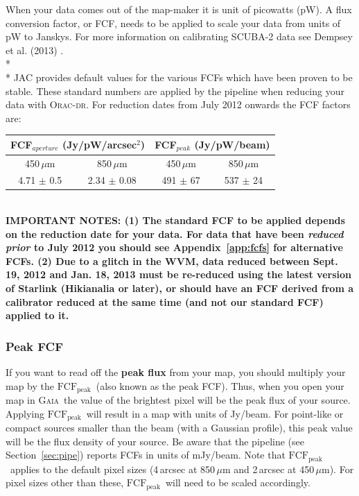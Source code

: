 \documentclass[twoside,11pt]{article}
\newcommand{\htmladdnormallink}[2]{#1}
\newcommand{\htmlref}[2]{#1}
\newcommand{\latexhtml}[2]{#1}
\newcommand{\xref}[3]{#1}
\renewcommand{\_}{\texttt{\symbol{95}}}
\newcommand{\fcfb}{$\mathrm{FCF_{peak}}$}
\newcommand{\gaia}{\xref{\textsc{Gaia}}{sun214}{}}
\newcommand{\oracdr}{\htmladdnormallink{\textsc{Orac-dr}}{http://www.oracdr.org/oracdr}}
\newcommand{\cref}[3]{\latexhtml{#1~\ref{#2}}{\htmlref{#3}{#2}}}
\begin{document}
When your data comes out of the map-maker it is unit of picowatts
(pW). A flux conversion factor, or FCF, needs to be applied to scale
your data from units of pW to Janskys. For more information on calibrating
SCUBA-2 data see Dempsey et al. (2013) \cite{dempsey12}.
\\*\\*
JAC provides default values for the various FCFs which have been proven
to be stable. These standard numbers are applied by the pipeline when
reducing your data with \oracdr. For reduction dates from July 2012
onwards the FCF factors are:
\begin{table}[h!]
\centering
\begin{tabular}{|c|c|c|c|}
\hline
\multicolumn{2}{|c|}{FCF$_{aperture}$ (Jy/pW/arcsec$^2$) } &
\multicolumn{2}{c|}{FCF$_{peak}$ (Jy/pW/beam)} \\
\hline
\hspace{0.4cm} 450\,$\mu$m \hspace{0.3cm} & 850\,$\mu$m & \hspace{0.4cm} 450\,$\mu$m \hspace{0.3cm}& 850\,$\mu$m \\
\hline
4.71 $\pm$ 0.5& 2.34 $\pm$ 0.08& 491 $\pm$ 67& 537 $\pm$ 24 \\
\hline
\end{tabular}
\end{table}
\\
\textbf{IMPORTANT NOTES: (1) The standard FCF to be applied depends on
the reduction date for your data. For data that have been
\emph{reduced prior} to July 2012 you should see
\cref{Appendix}{app:fcfs}{FCFs by Reduction Date} for alternative
FCFs. (2) Due to a glitch in the WVM, data reduced between Sept. 19,
2012 and Jan. 18, 2013 must be re-reduced using the latest version of
Starlink (Hikianalia or later), or should have an FCF derived from a
calibrator reduced at the same time (and not our standard FCF) applied
to it. }

\subsubsection{Peak FCF}

If you want to read off the \textbf{peak flux} from your map, you
should multiply your map by the \fcfb\ (also known as the peak FCF).
Thus, when you open your map in \gaia\ the value of the brightest
pixel will be the peak flux of your source. Applying \fcfb\ will
result in a map with units of Jy/beam. For point-like or compact
sources smaller than the beam (with a Gaussian profile), this peak
value will be the flux density of your source. Be aware that the
pipeline (see \cref{Section}{sec:pipe}{SCUBA-2 Pipeline}) reports FCFs
in units of mJy/beam.  Note that \fcfb\ applies to the default pixel
sizes (4\,arcsec at 850\,$\mu$m and 2\,arcsec at 450\,$\mu$m). For
pixel sizes other than these, \fcfb\ will need to be scaled accordingly.
\end{document}
